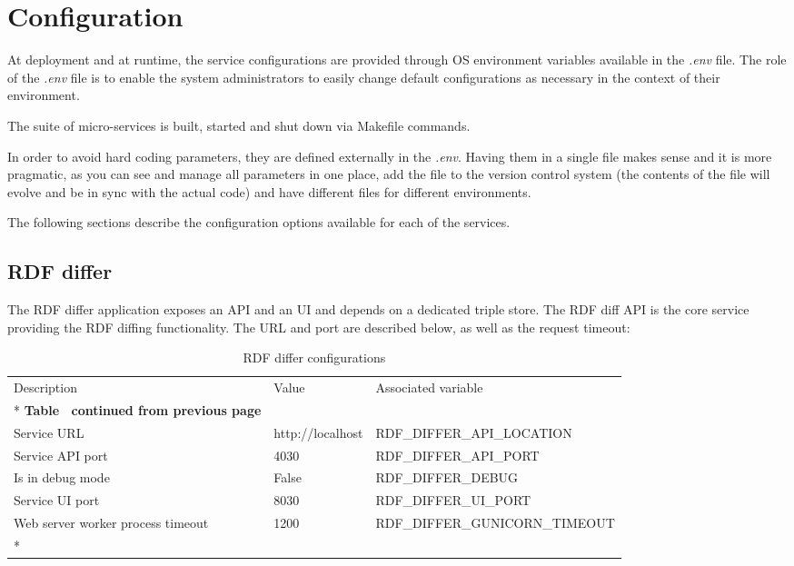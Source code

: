 \section{Configuration}
\label{sec:configuration}
At deployment and at runtime, the service configurations are provided through OS environment variables available in the \textit{.env} file. The role of the \textit{.env} file is to enable the system administrators to easily change default configurations as necessary in the context of their environment.

The suite of micro-services is built, started and shut down via Makefile commands.

In order to avoid hard coding parameters, they are defined externally in the \textit{.env}. Having them in a single file makes  sense and it is more pragmatic, as you can see and manage all parameters in one place, add the file to the version control system (the contents of the file will evolve and be in sync with the actual code) and have different files for different environments.

The following sections describe the configuration options available for each of the services.

\subsection{RDF differ}

The RDF differ application exposes an API and an UI and depends on a dedicated triple store. The RDF diff API is the core service providing the RDF diffing functionality. The URL and port are described below, as well as the request timeout:

\begin{longtable}[c]{@{}p{3.5cm}p{3.5cm}l@{}}
	\toprule
	Description                       & Value            & Associated variable            \\* \midrule
	\endfirsthead
	\multicolumn{3}{c}%
	{{\bfseries Table \thetable\ continued from previous page}}                           \\
	\endhead
	\bottomrule
	\endfoot
	\endlastfoot
	Service URL                       & http://localhost & RDF\_DIFFER\_API\_LOCATION     \\
	Service API port                  & 4030             & RDF\_DIFFER\_API\_PORT         \\
	Is in debug mode                  & False             & RDF\_DIFFER\_DEBUG             \\
	Service UI port                   & 8030             & RDF\_DIFFER\_UI\_PORT          \\
	Web server worker process timeout & 1200             & RDF\_DIFFER\_GUNICORN\_TIMEOUT \\* \bottomrule
	\caption{RDF differ configurations}
	\label{tab:my-table1}                                                                 \\
\end{longtable}

